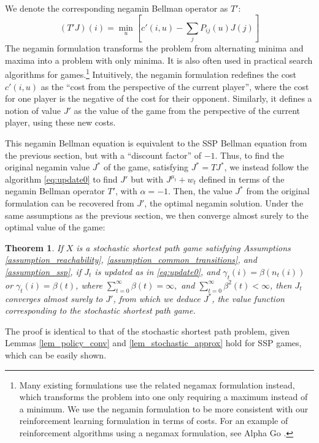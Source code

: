 \documentclass[12pt]{article}
\newtheorem{theorem}{Theorem}
\begin{document}
We denote the corresponding negamin Bellman operator as $T'$:
\begin{equation*}
    (T'J)(i) = \min_{u} \left[ c'(i,u) - \sum_j P_{ij}(u) J(j) \right]
\end{equation*}
 The negamin formulation transforms the problem from alternating minima and maxima into a problem with only minima. It is also often used in practical search algorithms for games.\footnote{Many existing formulations use the related negamax formulation instead, which transforms the problem into one only requiring a maximum instead of a minimum. We use the negamin formulation to be more consistent with our reinforcement learning formulation in terms of costs. For an example of reinforcement algorithms using a negamax formulation, see Alpha Go \cite{silver2016mastering}.} Intuitively, the negamin formulation redefines the cost $c'(i,u)$ as the ``cost from the perspective of the current player'', where the cost for one player is the negative of the cost for their opponent. Similarly, it defines a notion of value $J'$ as the value of the game from the perspective of the current player, using these new costs.
 
This negamin Bellman equation is equivalent to the SSP Bellman equation from the previous section, but with a ``discount factor'' of $-1$. Thus, to find the original negamin value $J^*$ of the game, satisfying $J^*=TJ^*$, we instead follow the algorithm \eqref{eq:update0} to find $J'$ but with $J^{\mu_t}+w_t$ defined in terms of the negamin Bellman operator $T'$, with $\alpha = -1$. Then, the value $J^*$ from the original formulation can be recovered from $J'$, the optimal negamin solution. Under the same assumptions as the previous section, we then converge almost surely to the optimal value of the game:

\begin{theorem}
	If $X$ is a stochastic shortest path game satisfying Assumptions \ref{assumption_reachability}, \ref{assumption_common_transitions}, and \ref{assumption_ssp}, if $J_t$ is updated as in \eqref{eq:update0}, and $\gamma_t(i) = \beta(n_t(i))$ or $\gamma_t(i) = \beta(t)$, where $\sum_{t=0}^\infty \beta(t) = \infty,$ and $\sum_{t=0}^\infty \beta^2(t) < \infty$, then $J_t$ converges almost surely to $J'$, from which we deduce $J^*$, the value function corresponding to the stochastic shortest path game.
\end{theorem}

The proof is identical to that of the stochastic shortest path problem, given Lemmas \ref{lem_policy_conv} and \ref{lem_stochastic_approx} hold for SSP games, which can be easily shown. 
\end{document}
